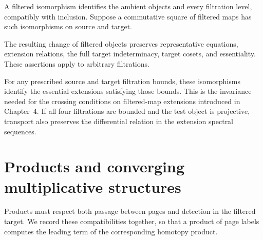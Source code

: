 \begin{definition}
\label{sem:SpectralSequence:filtered-transport}
A filtered isomorphism identifies the ambient objects and every filtration level, compatibly with inclusion. Suppose a commutative square of filtered maps has such isomorphisms on source and target.

The resulting change of filtered objects preserves representative equations, extension relations, the full target indeterminacy, target cosets, and essentiality. These assertions apply to arbitrary filtrations.

For any prescribed source and target filtration bounds, these
isomorphisms identify the essential extensions satisfying those bounds.
This is the invariance needed for the crossing conditions on filtered-map
extensions introduced in Chapter~4. If all four filtrations are bounded
and the test object is projective, transport also preserves the
differential relation in the extension spectral sequences.
\end{definition}


\section{Products and converging multiplicative structures}

Products must respect both passage between pages and detection in the
filtered target. We record these compatibilities together, so that a
product of page labels computes the leading term of the corresponding
homotopy product.

